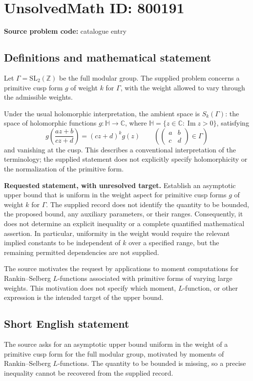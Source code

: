 \documentclass[11pt]{article}
\newcommand{\Z}{\mathbb{Z}}
\newcommand{\C}{\mathbb{C}}
\begin{document}
\section*{UnsolvedMath ID: 800191}
\textbf{Source problem code:} catalogue entry
\subsection{Definitions and mathematical statement}
Let \(\Gamma=\mathrm{SL}_2(\Z)\) be the full modular group. The supplied problem concerns a primitive cusp form \(g\) of weight \(k\) for \(\Gamma\), with the weight allowed to vary through the admissible weights.

Under the usual holomorphic interpretation, the ambient space is \(S_k(\Gamma)\): the space of holomorphic functions \(g\colon\mathbb H\to\C\), where \(\mathbb H=\{z\in\C:\operatorname{Im}z>0\}\), satisfying
\[
 g\!\left(\frac{az+b}{cz+d}\right)=(cz+d)^k g(z)
 \qquad
 \left(\begin{pmatrix}a&b\\c&d\end{pmatrix}\in\Gamma\right)
\]
and vanishing at the cusp. This describes a conventional interpretation of the terminology; the supplied statement does not explicitly specify holomorphicity or the normalization of the primitive form.

\textbf{Requested statement, with unresolved target.} Establish an asymptotic upper bound that is uniform in the weight aspect for primitive cusp forms \(g\) of weight \(k\) for \(\Gamma\). The supplied record does not identify the quantity to be bounded, the proposed bound, any auxiliary parameters, or their ranges. Consequently, it does not determine an explicit inequality or a complete quantified mathematical assertion. In particular, uniformity in the weight would require the relevant implied constants to be independent of \(k\) over a specified range, but the remaining permitted dependencies are not supplied.

The source motivates the request by applications to moment computations for Rankin--Selberg \(L\)-functions associated with primitive forms of varying large weights. This motivation does not specify which moment, \(L\)-function, or other expression is the intended target of the upper bound.
\subsection{Short English statement}
The source asks for an asymptotic upper bound uniform in the weight of a primitive cusp form for the full modular group, motivated by moments of Rankin--Selberg \(L\)-functions. The quantity to be bounded is missing, so a precise inequality cannot be recovered from the supplied record.
\end{document}
